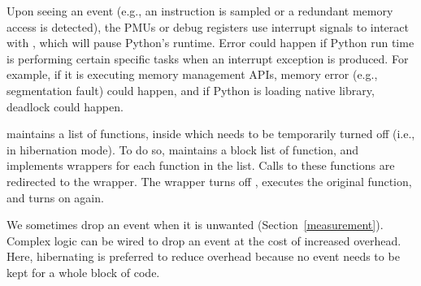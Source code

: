Upon seeing an event (e.g., an instruction is sampled or a redundant memory access is detected), the
PMUs or debug registers use interrupt signals to interact with \tool, which will pause Python's runtime. Error could happen if Python run time is performing certain specific tasks when an interrupt exception is produced. For example, if it is executing memory management APIs, memory error (e.g., segmentation fault) could happen, and if Python is loading native library, deadlock could happen. 




\tool maintains a list of functions, inside which \tool needs to be temporarily turned off (i.e., in hibernation mode). To do so, \tool maintains a block list of function, and implements wrappers for each function in the list. Calls to these functions are redirected to the wrapper. The wrapper turns off \tool, executes the original function, and turns on \tool again.  

 We sometimes drop an event when it is unwanted (Section~\ref{measurement}). Complex logic can be wired to drop an event at the cost of increased overhead. Here, hibernating \tool is preferred to reduce overhead because no event needs to be kept for a whole block of code. 







